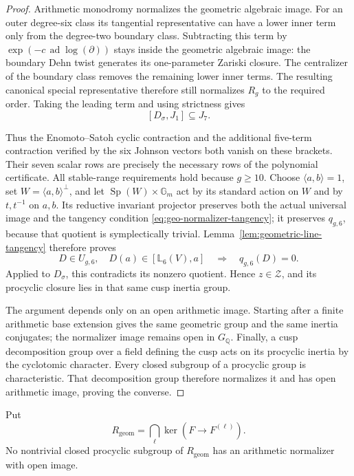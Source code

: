 \begin{proof}
Arithmetic monodromy normalizes the geometric algebraic image.
For an outer degree-six class its tangential representative
can have a lower inner term only from the degree-two
boundary class.  Subtracting this term by
\(\exp(-c\,\operatorname{ad}\log(\partial))\) stays inside
the geometric algebraic image: the boundary Dehn twist
generates its one-parameter Zariski closure.
The centralizer of the boundary class removes the
remaining lower inner terms.
The resulting canonical special representative therefore
still normalizes \(R_g\) to the required order.
Taking the leading term and using strictness gives
\[
                         [D_\sigma,J_1]\subseteq J_7.
\]

Thus the Enomoto--Satoh cyclic contraction and the additional
five-term contraction verified by the six Johnson vectors
both vanish on these brackets.  Their seven scalar rows
are precisely the necessary rows of the polynomial certificate.
All stable-range requirements hold because \(g\geq10\).
Choose \(\langle a,b\rangle=1\), set
\(W=\langle a,b\rangle^\perp\), and let
\(\operatorname{Sp}(W)\times\mathbb G_m\) act by its standard
action on \(W\) and by \(t,t^{-1}\) on \(a,b\).
Its reductive invariant projector preserves both the actual universal
image and the tangency condition
\eqref{eq:geo-normalizer-tangency}; it preserves \(q_{g,6}\),
because that quotient is symplectically trivial.
Lemma~\ref{lem:geometric-line-tangency} therefore proves
\[
 D\in U_{g,6},\quad D(a)\in[\mathbb L_6(V),a]
                       \quad\Longrightarrow\quad q_{g,6}(D)=0.
\]
Applied to \(D_\sigma\), this contradicts its nonzero quotient.
Hence \(z\in\mathcal Z\), and its procyclic closure lies
in that same cusp inertia group.

The argument depends only on an open arithmetic image.
Starting after a finite arithmetic base extension gives
the same geometric group and the same inertia conjugates;
the normalizer image remains open in \(G_{\mathbb Q}\).
Finally, a cusp decomposition group over a field defining
the cusp acts on its procyclic inertia by the cyclotomic
character.  Every closed subgroup of a procyclic group
is characteristic.  That decomposition group therefore
normalizes it and has open arithmetic image, proving
the converse.
\end{proof}

\begin{corollary}\label{cor:geometric-common-kernel-recognition}
Put
\[
 R_{\mathrm{geom}}=
 \bigcap_\ell\ker\!\left(F\longrightarrow F^{(\ell)}\right).
\]
No nontrivial closed procyclic subgroup of \(R_{\mathrm{geom}}\)
has an arithmetic normalizer with open image.
\end{corollary}

